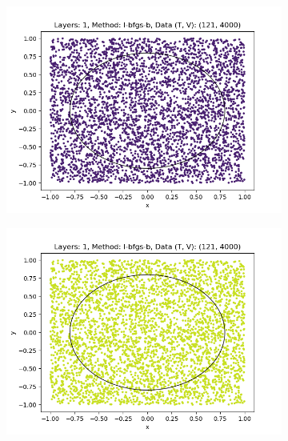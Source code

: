 \begin{figure}[h]
    \centering
    \begin{subfigure}[b]{0.45\textwidth}
        \centering
        \includegraphics[width=\textwidth]{sections/chapters/Quantum-Machine-Learning/Images/Data-Re-Uploading/Layer1-B.png}
    \end{subfigure}
    \begin{subfigure}[b]{0.45\textwidth}
        \centering
        \includegraphics[width=\textwidth]{sections/chapters/Quantum-Machine-Learning/Images/Data-Re-Uploading/Layer1-A.png}
    \end{subfigure}
    \begin{subfigure}[b]{0.45\textwidth}
        \centering

\end{subfigure}
\end{figure}
